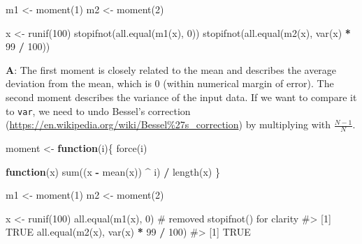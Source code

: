 \documentclass[
]{krantz}
\makeatletter
\newenvironment{Shaded}{\begin{snugshade}}{\end{snugshade}}
\newcommand{\CommentTok}[1]{\textcolor[rgb]{0.56,0.35,0.01}{\textit{#1}}}
\newcommand{\ControlFlowTok}[1]{\textcolor[rgb]{0.13,0.29,0.53}{\textbf{#1}}}
\newcommand{\DecValTok}[1]{\textcolor[rgb]{0.00,0.00,0.81}{#1}}
\newcommand{\KeywordTok}[1]{\textcolor[rgb]{0.13,0.29,0.53}{\textbf{#1}}}
\newcommand{\NormalTok}[1]{#1}
\newcommand{\OperatorTok}[1]{\textcolor[rgb]{0.81,0.36,0.00}{\textbf{#1}}}
\newcommand{\StringTok}[1]{\textcolor[rgb]{0.31,0.60,0.02}{#1}}
\renewcommand{\href}[2]{#2 (\url{#1})}
\newenvironment{kframe}{%
\medskip{}
\setlength{\fboxsep}{.8em}
 \def\at@end@of@kframe{}%
 \ifinner\ifhmode%
  \def\at@end@of@kframe{\end{minipage}}%
  \begin{minipage}{\columnwidth}%
 \fi\fi%
 \def\FrameCommand##1{\hskip\@totalleftmargin \hskip-\fboxsep
 \colorbox{shadecolor}{##1}\hskip-\fboxsep
     \hskip-\linewidth \hskip-\@totalleftmargin \hskip\columnwidth}%
 \MakeFramed {\advance\hsize-\width
   \@totalleftmargin\z@ \linewidth\hsize
   \@setminipage}}%
 {\par\unskip\endMakeFramed%
 \at@end@of@kframe}
\renewenvironment{Shaded}{\begin{kframe}}{\end{kframe}}
\renewcommand{\KeywordTok} [1]{\textcolor[rgb]{0.00,0.44,0.13}{{#1}}}
\renewcommand{\DecValTok}  [1]{\textcolor[rgb]{0.25,0.63,0.44}{{#1}}}
\renewcommand{\StringTok}  [1]{\textcolor[rgb]{0.25,0.44,0.63}{{#1}}}
\renewcommand{\CommentTok} [1]{\textcolor[rgb]{0.38,0.63,0.69}{{#1}}}
\renewcommand{\NormalTok}  [1]{{#1}}
\makeatother
\begin{document}
\begin{Shaded}
\begin{Highlighting}[]
\NormalTok{m1 <-}\StringTok{ }\KeywordTok{moment}\NormalTok{(}\DecValTok{1}\NormalTok{)}
\NormalTok{m2 <-}\StringTok{ }\KeywordTok{moment}\NormalTok{(}\DecValTok{2}\NormalTok{)}

\NormalTok{x <-}\StringTok{ }\KeywordTok{runif}\NormalTok{(}\DecValTok{100}\NormalTok{)}
\KeywordTok{stopifnot}\NormalTok{(}\KeywordTok{all.equal}\NormalTok{(}\KeywordTok{m1}\NormalTok{(x), }\DecValTok{0}\NormalTok{))}
\KeywordTok{stopifnot}\NormalTok{(}\KeywordTok{all.equal}\NormalTok{(}\KeywordTok{m2}\NormalTok{(x), }\KeywordTok{var}\NormalTok{(x) }\OperatorTok{*}\StringTok{ }\DecValTok{99} \OperatorTok{/}\StringTok{ }\DecValTok{100}\NormalTok{))}
\end{Highlighting}
\end{Shaded}

\textbf{{A}}: The first moment is closely related to the mean and describes the average deviation from the mean, which is 0 (within numerical margin of error). The second moment describes the variance of the input data. If we want to compare it to \texttt{var}, we need to undo \href{https://en.wikipedia.org/wiki/Bessel\%27s_correction}{Bessel's correction} by multiplying with \(\frac{N-1}{N}\).

\begin{Shaded}
\begin{Highlighting}[]
\NormalTok{moment <-}\StringTok{ }\ControlFlowTok{function}\NormalTok{(i)\{}
  \KeywordTok{force}\NormalTok{(i)}
  
  \ControlFlowTok{function}\NormalTok{(x) }\KeywordTok{sum}\NormalTok{((x }\OperatorTok{-}\StringTok{ }\KeywordTok{mean}\NormalTok{(x)) }\OperatorTok{^}\StringTok{ }\NormalTok{i) }\OperatorTok{/}\StringTok{ }\KeywordTok{length}\NormalTok{(x)}
\NormalTok{\}}

\NormalTok{m1 <-}\StringTok{ }\KeywordTok{moment}\NormalTok{(}\DecValTok{1}\NormalTok{)}
\NormalTok{m2 <-}\StringTok{ }\KeywordTok{moment}\NormalTok{(}\DecValTok{2}\NormalTok{)}

\NormalTok{x <-}\StringTok{ }\KeywordTok{runif}\NormalTok{(}\DecValTok{100}\NormalTok{)}
\KeywordTok{all.equal}\NormalTok{(}\KeywordTok{m1}\NormalTok{(x), }\DecValTok{0}\NormalTok{)  }\CommentTok{# removed stopifnot() for clarity}
\CommentTok{#> [1] TRUE}
\KeywordTok{all.equal}\NormalTok{(}\KeywordTok{m2}\NormalTok{(x), }\KeywordTok{var}\NormalTok{(x) }\OperatorTok{*}\StringTok{ }\DecValTok{99} \OperatorTok{/}\StringTok{ }\DecValTok{100}\NormalTok{)}
\CommentTok{#> [1] TRUE}
\end{Highlighting}
\end{Shaded}
\end{document}

